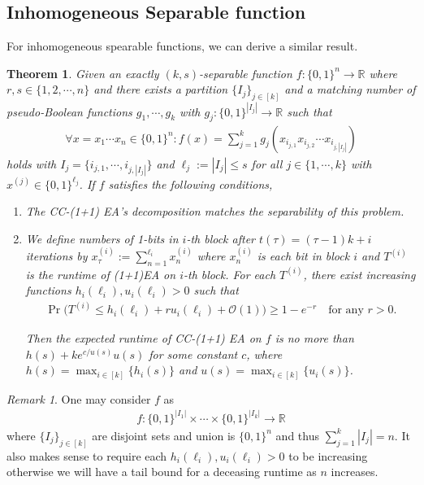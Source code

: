 \documentclass[a4paper,11pt]{report}
\theoremstyle{plain} %
\newtheorem{thm}{Theorem}[section]
\theoremstyle{definition} %
\theoremstyle{remark} %
\newtheorem*{rem}{Remark}
\begin{document}
\subsection{Inhomogeneous Separable function}
For inhomogeneous spearable functions, we can derive a similar result. 
\begin{thm}Given an exactly $(k,s)$-separable function $f:\{0,1\}^n \rightarrow \mathbb{R}$  where $r,s\in \{1,2,\cdots ,n\}$ and there exists a partition $\{I_{j}\}_{j\in [k]}$ and a matching number of pseudo-Boolean functions $g_{1},\cdots ,g_{k}$ with $g_{j}:\{0,1\}^{|I_{j}|} \rightarrow \mathbb{R}$ such that 
\begin{align*}
   \forall	 x= x_{1}\cdots x_{n} \in \{0,1\}^n:  f(x)= \sum_{j=1}^k g_{j}(x_{i_{j,1}}x_{i_{j,2}}\cdots x_{i_{j,|I_{j}|}} )
\end{align*}
holds with $I_{j}=\{i_{j,1}, \cdots , i_{j,|I_{j}|}\}$ and $\ell_{j}:=|I_{j} |\leq s$ for all $j\in \{1, \cdots ,k\}$ with $x^{(j)}\in \{0,1\}^{\ell_{j}}$. If $f$ satisfies the following conditions,


\begin{enumerate}
    \item[(1)] The CC-(1+1) EA's decomposition matches the separability of this problem. 
    
    \item[(2)] We define numbers of 1-bits in $i$-th block after $t(\tau)=(\tau -1)k+i$ iterations by $x_{\tau}^{(i)}:=\sum_{n=1}^{\ell_{i}} x_{n}^{(i)}$ where $x_{n}^{(i)}$ is each bit in block $i$ and $T^{(i)}$ is the runtime of (1+1)EA on $i$-th block.  For each $T^{(i)}$, there exist increasing functions $h_{i}(\ell_{i}), u_{i}(\ell_{i})>0$ such that 
    \begin{align*}
        \Pr \big( T^{(i)}\leq h_{i}(\ell_{i}) +r u_{i}(\ell_{i}) +\mathcal{O}(1) \big) \geq 1-e^{-r} \quad \text{for any $r>0$}.
    \end{align*}

Then the expected runtime of CC-(1+1) EA on $f$ is no more than $h(s)+ke^{c/u(s)}u(s)$ for some constant $c$, where $h(s)=\max _{i\in [k]} \{h_{i}(s)\}$ and $u(s)=\max _{i\in [k]} \{u_{i}(s)\}$.

\end{enumerate}

\end{thm}

\begin{rem}
One may consider $f$ as
\begin{align*}
    f: \{0,1\}^{|I_{1}|} \times \cdots \times  \{0,1\}^{|I_{k}|} \rightarrow \mathbb{R}
\end{align*}
where $\{I_{j}\}_{j\in [k]}$ are disjoint sets and union is $\{0,1\}^n$ and thus $\sum_{j=1}^k |I_{j}|=n$. It also makes sense to require each $h_{i}(\ell_{i}), u_{i}(\ell_{i})>0$ to be increasing otherwise we will have a tail bound for a deceasing runtime as $n$ increases.  
\end{rem}
\end{document}
